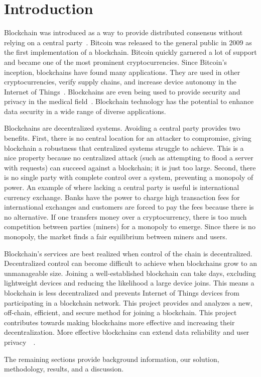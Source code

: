 \section{Introduction}
\label{sec:introduction}



Blockchain was introduced as a way to provide distributed consensus without relying on a central party~\cite{nakamoto2009Bitcoin}.
Bitcoin was released to the general public in 2009 as the first implementation of a blockchain.
Bitcoin quickly garnered a lot of support and became one of the most prominent cryptocurrencies.
Since Bitcoin's inception, blockchains have found many applications.
They are used in other cryptocurrencies, verify supply chains, and increase device autonomy in the Internet of Things~\cite{cai2018DecentralizedApplications}.
Blockchains are even being used to provide security and privacy in the medical field~\cite{siyal2019MedicalApplications}.
Blockchain technology has the potential to enhance data security in a wide range of diverse applications.

Blockchains are decentralized systems.
Avoiding a central party provides two benefits.
First, there is no central location for an attacker to compromise, giving blockchain a robustness that centralized systems struggle to achieve.
This is a nice property because no centralized attack (such as attempting to flood a server with requests) can succeed against a blockchain; it is just too large.
Second, there is no single party with complete control over a system, preventing a monopoly of power.
An example of where lacking a central party is useful is international currency exchange.
Banks have the power to charge high transaction fees for international exchanges and customers are forced to pay the fees because there is no alternative.
If one transfers money over a cryptocurrency, there is too much competition between parties (miners) for a monopoly to emerge.
Since there is no monopoly, the market finds a fair equilibrium between miners and users.

Blockchain’s services are best realized when control of the chain is decentralized.
Decentralized control can become difficult to achieve when blockchains grow to an unmanageable size.
Joining a well-established blockchain can take days, excluding lightweight devices and reducing the likelihood a large device joins.
This means a blockchain is less decentralized and prevents Internet of Things devices from participating in a blockchain network.
This project provides and analyzes a new, off-chain, efficient, and secure method for joining a blockchain.
This project contributes towards making blockchains more effective and increasing their decentralization.
More effective blockchains can extend data reliability and user privacy~\cite{cai2018DecentralizedApplications}~\cite{siyal2019MedicalApplications}.

The remaining sections provide background information, our solution, methodology, results, and a discussion.
